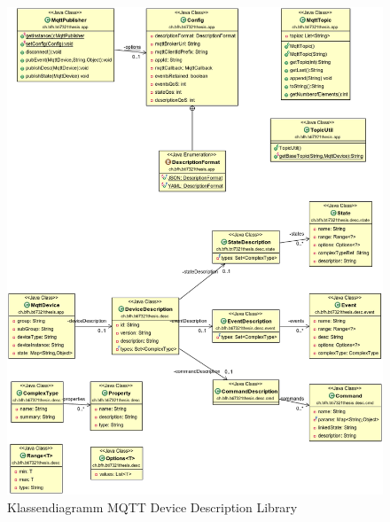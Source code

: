 \begin{figure}[H]
	\centering
		\includegraphics[width=1.0\textwidth]{diag/Lib_class_overview.png}
	\caption{Klassendiagramm MQTT Device Description Library}
\end{figure}

